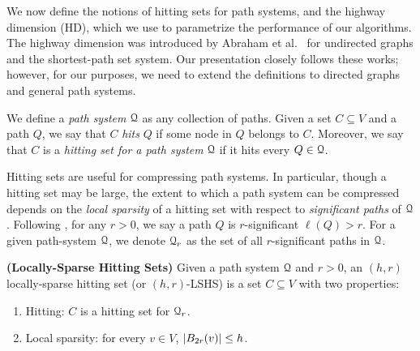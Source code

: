 
We now define the notions of hitting sets for path systems, and the highway dimension (HD), which we use to parametrize the performance of our algorithms. The highway dimension was introduced by Abraham et al.~\cite{highway2010,highway2013} for undirected graphs and the shortest-path set system. Our presentation closely follows these works; however, for our purposes, we need to extend the definitions to directed graphs and general path systems. 

We define a \emph{path system} $\mathcal{Q}$ as any collection of paths. Given a set $C\subseteq V$ and a path $Q$, we say that $C$ \emph{hits} $Q$ if some node in $Q$ belongs to $C$. Moreover, we say that $C$ is a \emph{hitting set for a path system} $\mathcal{Q}$ if it hits every $Q\in\mathcal{Q}$.


Hitting sets are useful for compressing path systems. In particular, though a hitting set may be large, the extent to which a path system can be compressed depends on the \emph{local sparsity} of a hitting set with respect to \emph{significant paths} of $\mathcal{Q}$. 
Following \cite{highway2013}, for any $r>0$, we say a path $Q$ is $r$-significant $\ell(Q)>r$. For a given path-system $\mathcal{Q}$, we denote $\mathcal{Q}_r$ as the set of all $r$-significant paths in $\mathcal{Q}$.
\begin{definition}
\label{def:lshs}
\textbf{(Locally-Sparse Hitting Sets)} Given a path system $\mathcal{Q}$ and $r>0$, an $(h,r)$ locally-sparse hitting set (or $(h,r)$-LSHS) is a set $C\subseteq V$ with two properties: 
\begin{enumerate}[nosep]
\item Hitting: $C$ is a hitting set for $\mathcal{Q}_r$.
\item Local sparsity: for every $v\in V$, $\lvert B_{2r}(v)\rvert\leq h$.
\end{enumerate}
\end{definition}

